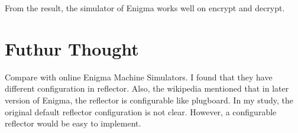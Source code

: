 \documentclass[11pt,a4paper]{article}
\begin{document}
From the result, the simulator of Enigma works well on encrypt and decrypt.
\section{Futhur Thought}
Compare with online Enigma Machine Simulators. I found that they have different configuration in reflector. Also, the wikipedia mentioned that in later version of Enigma, the reflector is configurable like plugboard. In my study, the original default reflector configuration is not clear. However, a configurable reflector would be easy to implement.

\nocite{*}

 
\end{document}
